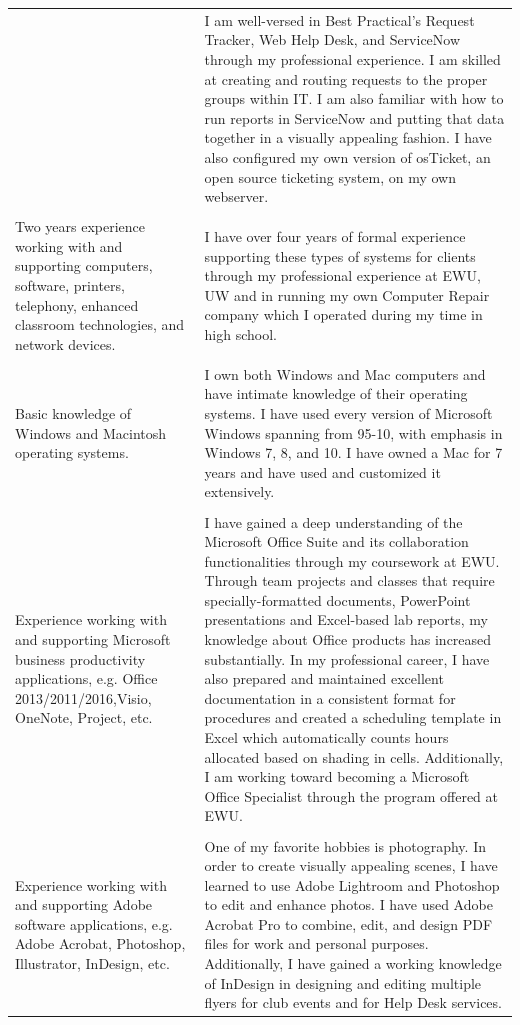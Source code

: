 \documentclass[a4paper,10pt]{article}
\begin{document}
\begin{longtable}{|p{.35\linewidth}|p{.6\linewidth}|}
	& I am well-versed in Best Practical's Request Tracker, Web Help Desk, and ServiceNow through my professional experience. I am skilled at creating and routing requests to the proper groups within IT. I am also familiar with how to run reports in ServiceNow and putting that data together in a visually appealing fashion. I have also configured my own version of osTicket, an open source ticketing system, on my own webserver. \\
	&\\
	Two years experience working with and supporting computers, software, printers, telephony, enhanced classroom technologies, and network devices.
	& I have over four years of formal experience supporting these types of systems for clients through my professional experience at EWU, UW and in running my own Computer Repair company which I operated during my time in high school.\\
	&\\
	Basic knowledge of Windows and Macintosh operating systems.
	& I own both Windows and Mac computers and have intimate knowledge of their operating systems. I have used every version of Microsoft Windows spanning from 95-10, with emphasis in Windows 7, 8, and 10. I have owned a Mac for 7 years and have used and customized it extensively.\\
	&\\
	Experience working with and supporting Microsoft business productivity applications, e.g. Office 2013/2011/2016,Visio, OneNote, Project, etc.
	& I have gained a deep understanding of the Microsoft Office Suite and its collaboration functionalities through my coursework at EWU. Through team projects and classes that require specially-formatted documents, PowerPoint presentations and Excel-based lab reports, my knowledge about Office products has increased substantially. In my professional career, I have also prepared and maintained excellent documentation in a consistent format for procedures and created a scheduling template in Excel which automatically counts hours allocated based on shading in cells. Additionally, I am working toward becoming a Microsoft Office Specialist through the program offered at EWU.\\
	&\\
	Experience working with and supporting Adobe software applications, e.g. Adobe Acrobat, Photoshop, Illustrator, InDesign, etc.
	& One of my favorite hobbies is photography. In order to create visually appealing scenes, I have learned to use Adobe Lightroom and Photoshop to edit and enhance photos. I have used Adobe Acrobat Pro to combine, edit, and design PDF files for work and personal purposes. Additionally, I have gained a working knowledge of InDesign in designing and editing multiple flyers for club events and for Help Desk services.\\

\end{longtable}
\end{document}
